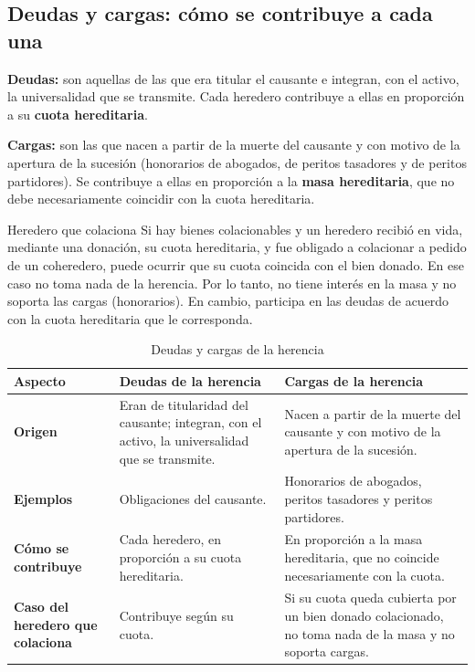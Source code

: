 \documentclass[12pt,oneside]{book}
\begin{document}
\subsection{Deudas y cargas: cómo se contribuye a cada una}

\begin{important}
\textbf{Deudas:} son aquellas de las que era titular el causante e integran, con el activo, la universalidad que se transmite. Cada heredero contribuye a ellas en proporción a su \textbf{cuota hereditaria}.

\textbf{Cargas:} son las que nacen a partir de la muerte del causante y con motivo de la apertura de la sucesión (honorarios de abogados, de peritos tasadores y de peritos partidores). Se contribuye a ellas en proporción a la \textbf{masa hereditaria}, que no debe necesariamente coincidir con la cuota hereditaria.
\end{important}

\begin{example}{Heredero que colaciona}
Si hay bienes colacionables y un heredero recibió en vida, mediante una donación, su cuota hereditaria, y fue obligado a colacionar a pedido de un coheredero, puede ocurrir que su cuota coincida con el bien donado. En ese caso no toma nada de la herencia. Por lo tanto, no tiene interés en la masa y no soporta las cargas (honorarios). En cambio, participa en las deudas de acuerdo con la cuota hereditaria que le corresponda.
\end{example}

\begin{table}[H]
\centering
\caption{Deudas y cargas de la herencia}
\small
\begin{tabularx}{\textwidth}{@{}>{\raggedright\arraybackslash}p{2.6cm}>{\raggedright\arraybackslash}X>{\raggedright\arraybackslash}X@{}}
\toprule
\textbf{Aspecto} & \textbf{Deudas de la herencia} & \textbf{Cargas de la herencia} \\
\midrule
\textbf{Origen} & Eran de titularidad del causante; integran, con el activo, la universalidad que se transmite. & Nacen a partir de la muerte del causante y con motivo de la apertura de la sucesión. \\
\textbf{Ejemplos} & Obligaciones del causante. & Honorarios de abogados, peritos tasadores y peritos partidores. \\
\textbf{Cómo se contribuye} & Cada heredero, en proporción a su cuota hereditaria. & En proporción a la masa hereditaria, que no coincide necesariamente con la cuota. \\
\textbf{Caso del heredero que colaciona} & Contribuye según su cuota. & Si su cuota queda cubierta por un bien donado colacionado, no toma nada de la masa y no soporta cargas. \\
\bottomrule
\end{tabularx}
\end{table}
\end{document}
